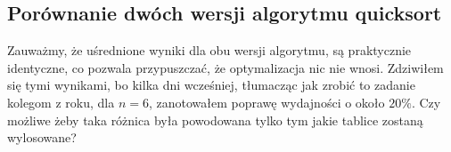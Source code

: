 \documentclass[12pt,a4paper]{article}
\begin{document}
\subsection*{Porównanie dwóch wersji algorytmu quicksort}
\begin{figure}[h!]
  \begin{center}
  \end{center}
\end{figure}
Zauważmy, że uśrednione wyniki dla obu wersji algorytmu, są praktycznie identyczne, co pozwala przypuszczać, że optymalizacja nic nie wnosi. Zdziwiłem się tymi wynikami, bo kilka dni wcześniej, tłumacząc jak zrobić to zadanie kolegom z roku, dla $n = 6$, zanotowałem poprawę wydajności o około $20\%$. Czy możliwe żeby taka różnica była powodowana tylko tym jakie tablice zostaną wylosowane?
\end{document}
